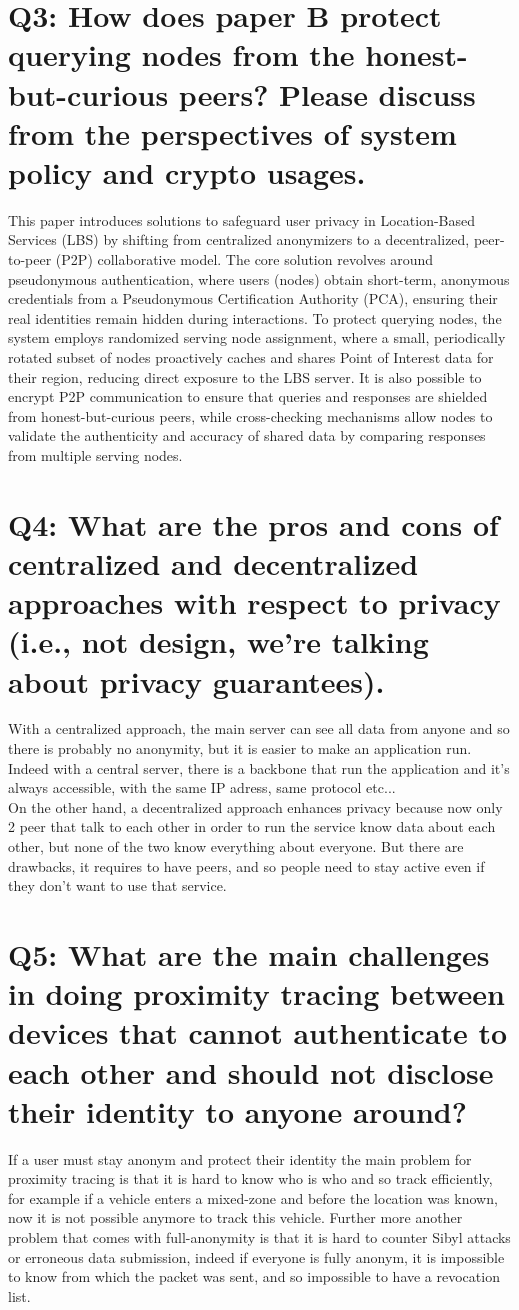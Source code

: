 \documentclass{article}
\begin{document}
\section*{
Q3: How does paper B protect querying nodes from the honest-but-curious peers? Please discuss from the perspectives of system policy and crypto usages.
}

This paper introduces solutions to safeguard user privacy in Location-Based Services (LBS) by shifting from centralized anonymizers to a decentralized, peer-to-peer (P2P) collaborative model. The core solution revolves around pseudonymous authentication, where users (nodes) obtain short-term, anonymous credentials from a Pseudonymous Certification Authority (PCA), ensuring their real identities remain hidden during interactions. To protect querying nodes, the system employs randomized serving node assignment, where a small, periodically rotated subset of nodes proactively caches and shares Point of Interest data for their region, reducing direct exposure to the LBS server. It is also possible to encrypt P2P communication to ensure that queries and responses are shielded from honest-but-curious peers, while cross-checking mechanisms allow nodes to validate the authenticity and accuracy of shared data by comparing responses from multiple serving nodes.

\section*{
Q4: What are the pros and cons of centralized and decentralized approaches with respect to privacy (i.e., not design, we're talking about privacy guarantees).
}

With a centralized approach, the main server can see all data from anyone and so there is probably no anonymity, but it is easier to make an application run. Indeed with a central server, there is a backbone that run the application and it's always accessible, with the same IP adress, same protocol etc... \\ 
On the other hand, a decentralized approach enhances privacy because now only 2 peer that talk to each other in order to run the service know data about each other, but none of the two  know everything about everyone. But there are drawbacks, it requires to have peers, and so people need to stay active even if they don't want to use that service.


\section*{
Q5: What are the main challenges in doing proximity tracing between devices that cannot authenticate to each other and should not disclose their identity to anyone around?
} 
If a user must stay anonym and protect their identity the main problem for proximity tracing is that it is hard to know who is who and so track efficiently, for example if a vehicle enters a mixed-zone and before the location was known, now it is not possible anymore to track this vehicle. Further more another problem that comes with full-anonymity is that it is hard to counter Sibyl attacks or erroneous data submission, indeed if everyone is fully anonym, it is impossible to know from which the packet was sent, and so impossible to have a revocation list.
\end{document}
